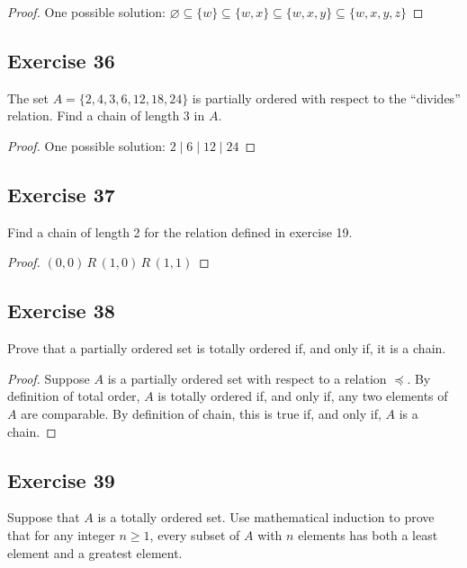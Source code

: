 \documentclass[14pt]{extarticle}
\newcommand{\es}{\varnothing}
\begin{document}
\begin{proof}
        One possible solution: \(\es \subseteq \{w\} \subseteq \{w, x\} \subseteq \{w, x, y\} \subseteq \{w, x, y, z\}\)
\end{proof}

\subsection{Exercise 36}
The set \(A = \{2, 4, 3, 6, 12, 18, 24\}\) is partially ordered with respect to the “divides” relation. Find a
chain of length 3 in \(A\).

\begin{proof}
        One possible solution: \(2 \mid 6 \mid 12 \mid 24\)
\end{proof}

\subsection{Exercise 37}
Find a chain of length 2 for the relation defined in exercise 19.

\begin{proof}
        \((0,0) \,R\, (1,0) \,R\, (1,1)\)
\end{proof}

\subsection{Exercise 38}
Prove that a partially ordered set is totally ordered if, and only if, it is a chain.

\begin{proof}
        Suppose $A$ is a partially ordered set with respect to a relation \(\preceq\). By definition of total order, $A$ is
        totally ordered if, and only if, any two elements of $A$ are comparable. By definition of chain, this is true if,
        and only if, $A$ is a chain.
\end{proof}

\subsection{Exercise 39}
Suppose that $A$ is a totally ordered set. Use mathematical induction to prove that for any integer \(n \geq 1\), every
subset of $A$ with $n$ elements has both a least element and a greatest element.
\end{document}
